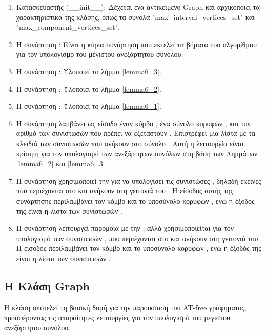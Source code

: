 \begin{enumerate}
	\item Κατασκευαστής (\_\_init\_\_): Δέχεται ένα αντικείμενο  Graph και αρχικοποιεί τα χαρακτηριστικά της κλάσης, όπως τα σύνολα "max\_interval\_vertices\_set" και "max\_component\_vertices\_set".
	\item H συνάρτηση : Είναι η κύρια συνάρτηση που εκτελεί τα βήματα του αλγορίθμου για τον υπολογισμό του μέγιστου ανεξάρτητου συνόλου.
	\item Η συνάρτηση : Υλοποιεί το λήμμα \ref{lemma6_3}.
	\item H συνάρτηση : Υλοποιεί το λήμμα \ref{lemma6_2}.
	\item H συνάρτηση : Υλοποιεί το λήμμα \ref{lemma6_1}.
	\item Η συνάρτηση  λαμβάνει ως είσοδο έναν κόμβο , ένα σύνολο κορυφών , και τον αριθμό των συνιστωσών που πρέπει να εξεταστούν . Επιστρέφει μια λίστα με τα κλειδιά των συνιστωσών που ανήκουν στο σύνολο . Αυτή η λειτουργία είναι κρίσιμη για τον υπολογισμό των ανεξάρτητων συνόλων στη βάση των Λημμάτων \ref{lemma6_2} και \ref{lemma6_3}.
	\item Η συνάρτηση  χρησιμοποιεί την  για να υπολογίσει τις συνιστώσες , δηλαδή εκείνες που περιέχονται στο  και ανήκουν στη γειτονιά του . Η είσοδος αυτής της συνάρτησης περιλαμβάνει τον κόμβο  και το υποσύνολο κορυφών , ενώ η έξοδός της είναι η λίστα των συνιστωσών .
	\item Η συνάρτηση  λειτουργεί παρόμοια με την , αλλά χρησιμοποιείται για τον υπολογισμό των συνιστωσών , που περιέχονται στο  και ανήκουν στη γειτονιά του . Η είσοδος περιλαμβάνει τον κόμβο  και το υποσύνολο κορυφών , ενώ η έξοδός της είναι η λίστα των συνιστωσών .
\end{enumerate}

\subsection{H Kλάση Graph}

Η κλάση  αποτελεί τη βασική δομή για την παρουσίαση του AT-free γράφηματος, προσφέροντας τις απαραίτητες λειτουργίες για τον υπολογισμό του μέγιστου ανεξάρτητου συνόλου.

